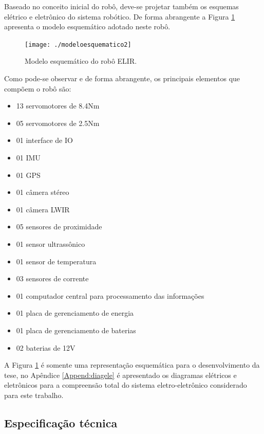 Baseado no conceito inicial do robô, deve-se projetar também os esquemas elétrico e eletrônico do sistema robótico. De forma abrangente a Figura \ref{img:elirmodesq} apresenta o modelo esquemático adotado neste robô.

\begin{figure} [h!]	
	\caption{Modelo esquemático do robô ELIR.}
	\label{img:elirmodesq}											 
	\centering													 
	\texttt{[image: ./modeloesquematico2]}
\end{figure}													 

Como pode-se observar e de forma abrangente, os principais elementos que compõem o robô são:

\begin{itemize}
	\item 13 servomotores de 8.4Nm
	\item 05 servomotores de 2.5Nm
	\item 01 interface de IO
	\item 01 IMU
	\item 01 GPS
	\item 01 câmera stéreo
	\item 01 câmera LWIR
	\item 05 sensores de proximidade
	\item 01 sensor ultrassônico
	\item 01 sensor de temperatura
	\item 03 sensores de corrente
	\item 01 computador central para processamento das informações
	\item 01 placa de gerenciamento de energia
	\item 01 placa de gerenciamento de baterias
	\item 02 baterias de 12V
\end{itemize}

A Figura \ref{img:elirmodesq} é somente uma representação esquemática para o desenvolvimento da tese, no Apêndice \ref{Append:diagele} é apresentado os diagramas elétricos e eletrônicos para a compreensão total do sistema eletro-eletrônico considerado para este trabalho.


\subsection{Especificação técnica}
\label{ssec:espt}

